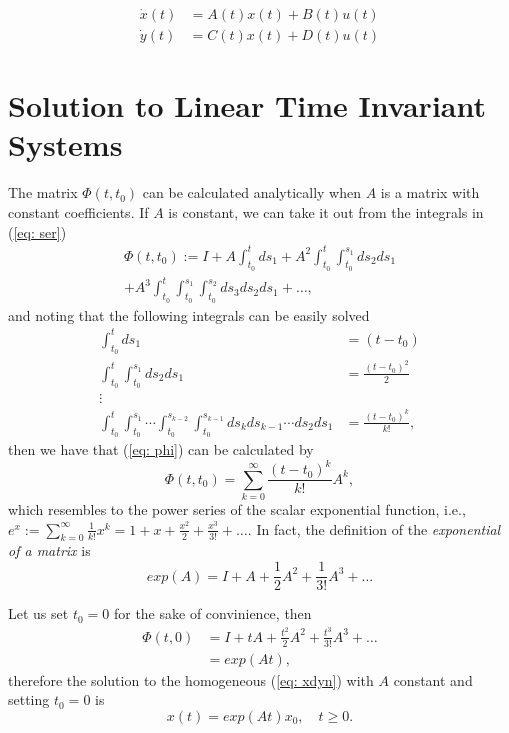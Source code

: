 \begin{align}
	\dot x(t) &= A(t)x(t) + B(t)u(t)  \nonumber \\
	\dot y(t) &= C(t)x(t) + D(t)u(t)  \nonumber
\end{align}

\section{Solution to Linear Time Invariant Systems}

The matrix $\Phi(t,t_0)$ can be calculated analytically when $A$ is a matrix with constant coefficients. If $A$ is constant, we can take it out from the integrals in (\ref{eq: ser})
\begin{align}
	\Phi(t,t_0) := I + A \int_{t_0}^t ds_1 + A^2 \int_{t_0}^t \int_{t_0}^{s_1} ds_2ds_1 \nonumber \\ + A^3 \int_{t_0}^t \int_{t_0}^{s_1} \int_{t_0}^{s_2} ds_3ds_2ds_1 + \dots \label{eq: phi},
\end{align}
and noting that the following integrals can be easily solved
\begin{align}
	\int_{t_0}^t ds_1 &= (t-t_0) \nonumber \\
	\int_{t_0}^t\int_{t_0}^{s_1} ds_2ds_1 &= \frac{(t-t_0)^2}{2} \nonumber \\
	\vdots \nonumber \\
	\int_{t_0}^t\int_{t_0}^{s_1} \cdots \int_{t_0}^{s_{k-2}}\int_{t_0}^{s_{k-1}}ds_k ds_{k-1} \cdots ds_2ds_1 &= \frac{(t-t_0)^k}{k!}, \nonumber
\end{align}
then we have that (\ref{eq: phi}) can be calculated by
\begin{equation}
	\Phi(t,t_0) = \sum_{k=0}^{\infty} \frac{(t-t_0)^k}{k!}A^k,
\end{equation}
which resembles to the power series of the scalar exponential function, i.e., $e^x := \sum_{k=0}^{\infty}\frac{1}{k!}x^k = 1 + x + \frac{x^2}{2} + \frac{x^3}{3!} + \dots $. In fact, the definition of the \emph{exponential of a matrix} is
\begin{equation}
	exp(A) = I + A + \frac{1}{2} A^2 + \frac{1}{3!} A^3 + \dots
\end{equation}

Let us set $t_0 = 0$ for the sake of convinience, then
\begin{align}
	\Phi(t,0) &= I + tA + \frac{t^2}{2} A^2 + \frac{t^3}{3!} A^3 + \dots \nonumber \\
	&= exp(At),
\end{align}
therefore the solution to the homogeneous (\ref{eq: xdyn}) with $A$ constant and setting $t_0 = 0$ is
\begin{equation}
	x(t) = exp(At)x_0,\quad t\geq 0.
	\label{eq: xexp}
\end{equation}

